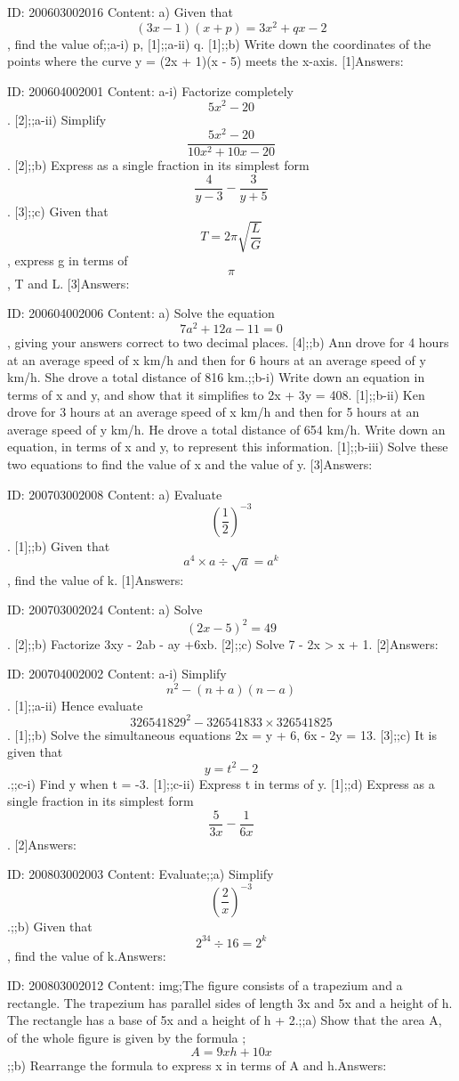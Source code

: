 \documentclass{article}
\begin{document}
ID: 200603002016
Content:
a) Given that $$(3x-1)(x+p)=3x^{2} +qx-2$$, find the value of;;a-i) p, [1];;a-ii) q. [1];;b) Write down the coordinates of the points where the curve y = (2x + 1)(x - 5) meets	the x-axis. [1]Answers:

ID: 200604002001
Content:
a-i) Factorize completely $$5x^{2} -20$$. [2];;a-ii) Simplify $$\frac{5x^{2} -20}{10x^{2} +10x-20}$$. [2];;b) Express as a single fraction in its simplest form $$\frac{4}{y-3}-\frac{3}{y+5}$$. [3];;c) Given that $$T=2\pi \sqrt{ \frac{L}{G}}$$, express g in terms of $$\pi$$, T and L. [3]Answers:

ID: 200604002006
Content:
a) Solve the equation $$7a^{2} +12a-11=0$$, giving your answers correct to two decimal places. [4];;b) Ann drove for 4 hours at an average speed of x km/h and then for 6 hours at an average speed of y km/h. She drove a total distance of 816 km.;;b-i) Write down an equation in terms of x and y, and show that it simplifies to 2x + 3y = 408. [1];;b-ii) Ken drove for 3 hours at an average speed of x km/h and then for 5 hours at an average speed of y km/h. He drove a total distance of 654 km/h. Write down an equation, in terms of x and y, to represent this information. [1];;b-iii) Solve these two equations to find the value of x and the value of y. [3]Answers:

ID: 200703002008
Content:
a) Evaluate $$(\frac{1}{2})^{-3} $$. [1];;b) Given that $$a^{4} \times a \div  \sqrt{a} =a^{k}$$, find the value of k. [1]Answers:

ID: 200703002024
Content:
a) Solve $$(2x-5)^{2} =49$$. [2];;b) Factorize 3xy - 2ab - ay +6xb. [2];;c) Solve 7 - 2x > x + 1. [2]Answers:

ID: 200704002002
Content:
a-i) Simplify $$n^{2} -(n+a)(n-a)$$. [1];;a-ii) Hence evaluate $$326541829^{2}-326541833 \times 326541825$$. [1];;b) Solve the simultaneous equations 2x = y + 6, 6x - 2y = 13. [3];;c) It is given that $$y=t^{2} -2$$.;;c-i) Find y when t = -3. [1];;c-ii) Express t in terms of y. [1];;d) Express as a single fraction in its simplest form $$\frac{5}{3x} - \frac{1}{6x}$$  . [2]Answers:

ID: 200803002003
Content:
Evaluate;;a) Simplify $$(\frac{2}{x})^{-3}$$.;;b) Given that $$2^{34} \div 16 = 2^k$$, find the value of k.Answers:

ID: 200803002012
Content:
img;The figure consists of a trapezium and a rectangle. The trapezium has parallel sides of length 3x and 5x and a height of h. The rectangle has a base of 5x and a height of h + 2.;;a) Show that the area A, of the whole figure is given by the formula ; $$A = 9xh + 10x$$;;b) Rearrange the formula to express x in terms of A and h.Answers:
\end{document}
